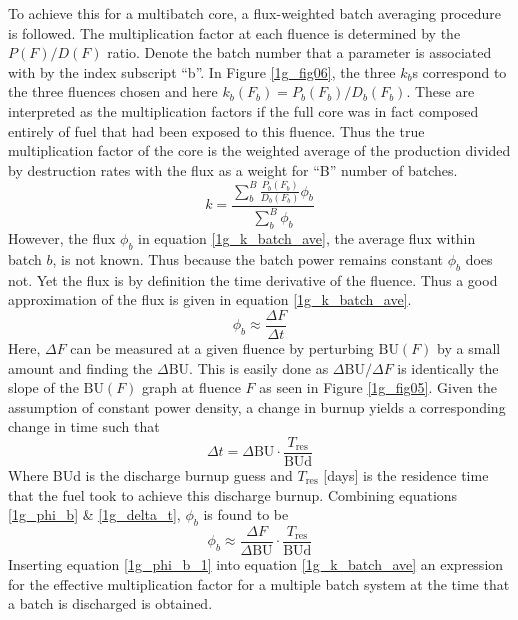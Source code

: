 To achieve this for a multibatch core, a flux-weighted batch averaging procedure is followed.  
The multiplication factor at each fluence is determined by the $P(F)/D(F)$ ratio.  Denote the batch 
number that a parameter is associated with by the index subscript ``b''.  In Figure \ref{1g_fig06}, 
the three $k_b$s correspond to the three fluences chosen and here $k_b(F_b) = P_b(F_b)/D_b(F_b)$.  
These are interpreted as the multiplication factors if the full core was in fact composed entirely 
of fuel that had been exposed to this fluence. Thus the true multiplication factor of the core is 
the weighted average of the production divided by destruction rates with the flux as a weight for 
``B'' number of batches.
\begin{equation}
\label{1g_k_batch_ave}
k = \frac{\sum_b^B \frac{P_b(F_b)}{D_b(F_b)} \phi_b}{\sum_b^B \phi_b}
\end{equation}
However, the flux $\phi_b$ in equation \ref{1g_k_batch_ave}, the average flux within batch $b$, is not known.  
Thus because the batch power remains constant $\phi_b$ does not.  Yet the flux is by definition the time 
derivative of the fluence. Thus a good approximation of the flux is given in equation \ref{1g_k_batch_ave}.
\begin{equation}
\label{1g_phi_b}
\phi_b \approx \frac{\Delta F}{\Delta t}
\end{equation}
Here, $\Delta F$ can be measured at a given fluence by perturbing $\mbox{BU}(F)$ by a small amount 
and finding the $\Delta\mbox{BU}$.  This is easily done as $\Delta\mbox{BU}/\Delta F$ is identically 
the slope of the $\mbox{BU}(F)$ graph at fluence $F$ as seen in Figure \ref{1g_fig05}.  Given the 
assumption of constant power density, a change in burnup yields a corresponding change in time such that
\begin{equation}
\label{1g_delta_t}
\Delta t = \Delta\mbox{BU} \cdot \frac{T_{\mbox{res}}}{\mbox{BUd}}
\end{equation}
Where BUd is the discharge burnup guess and $T_{\mbox{res}}$ [days] is the residence time that the 
fuel took to achieve this discharge burnup. Combining equations \ref{1g_phi_b} \& \ref{1g_delta_t}, 
$\phi_b$ is found to be
\begin{equation}
\label{1g_phi_b_1}
\phi_b \approx \frac{\Delta F}{\Delta \mbox{BU}} \cdot \frac{T_{\mbox{res}}}{\mbox{BUd}}
\end{equation}
Inserting equation \ref{1g_phi_b_1} into equation \ref{1g_k_batch_ave} an expression for the effective 
multiplication factor for a multiple batch system at the time that a batch is discharged is obtained.
